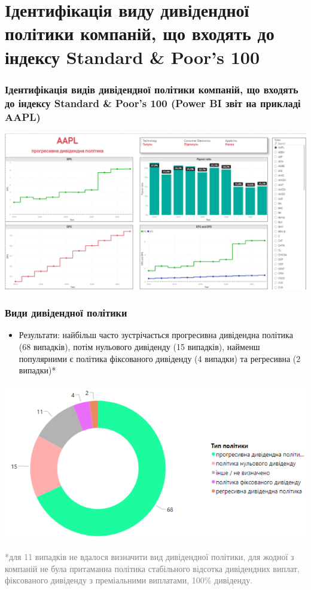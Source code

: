 \documentclass[aspectratio=169]{beamer}
\begin{document}
\section{Ідентифікація виду дивідендної політики компаній, що входять до індексу Standard \& Poor's 100}
\begin{frame}
\frametitle{Ідентифікація видів дивідендної політики компаній, що входять до індексу Standard \& Poor's 100 (Power BI звіт на прикладі AAPL)}
\begin{center}
\includegraphics[scale=0.30]{AAPL example.png}
\end{center}
\end{frame}

\begin{frame}
\frametitle{Види дивідендної політики}
\begin{center}
\begin{itemize}
\item  \alert {Результати:} найбільш часто зустрічається прогресивна дивідендна політика (68 випадків), потім нульового дивіденду (15 випадків), найменш популярними є політика фіксованого дивіденду (4 випадки) та регресивна (2 випадки)*
\end{itemize}
\tinyskip
\includegraphics[scale=0.40]{Dividend policy Types.png}
\tinyskip
\end{center}
\scriptsize \textcolor{gray}{*для 11 випадків не вдалося визначити вид дивідендної політики, для жодної з компаній не була притаманна політика стабільного відсотка дивідендних виплат, фіксованого дивіденду з преміальними виплатами, 100\% дивіденду.} 
\end{frame}
\end{document}
